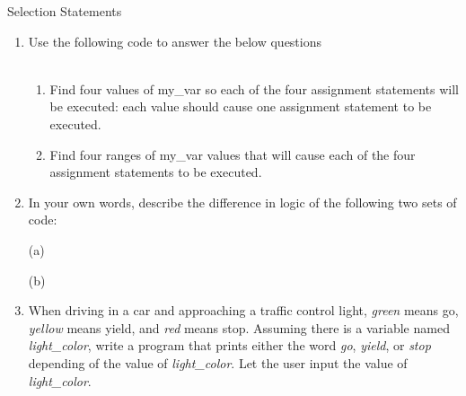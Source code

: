 \documentclass{article}
\begin{document}
\begin{flushright}
Selection Statements\end{flushright}

\vspace*{-1.5em}
\noindent\makebox[\linewidth]{\rule{\paperwidth}{0.4pt}}


\vspace*{2em}

\begin{enumerate}


	\item 
		Use the following code to answer the below questions\\
		\mbox{ \hspace*{0.25in}	}
		\begin{enumerate}
			\item Find four values of my\_var so each of the four assignment statements will be executed: 
				each value should cause one assignment statement to be executed.
			\item Find four ranges of my\_var values that will cause each of the four assignment 
				statements to be executed.
		\end{enumerate}


	\item 
		In your own words, describe the difference in logic of the following two sets of code:\\
		\begin{minipage}{.5\textwidth}
			(a) \mbox{\hspace*{2em} }
		\end{minipage}
		\begin{minipage}{.5\textwidth}
			(b) \mbox{\hspace*{2em} }
		\end{minipage}


	\item
		When driving in a car and approaching a traffic control light, \textit{green} means go, 
		\textit{yellow} means yield, and \textit{red} means stop.  Assuming there is a variable 
		named \textit{light\_color}, write a program that prints either the word \textit{go}, 
		\textit{yield}, or \textit{stop} depending of the value of \textit{light\_color}.  
		Let the user input the value of \textit{light\_color}.



\end{enumerate}
\end{document}
